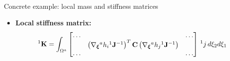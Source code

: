 \documentclass[aspectratio=169]{beamer}
\begin{document}
{\begin{frame}{Concrete example: local mass and stiffness matrices}
\begin{itemize}
    \item \textbf{Local stiffness matrix:}
          $$
            {}^1\mathbf K = \int_{\Omega^a} \begin{bmatrix}
              \dots &                                                                                                                            & \dots \\
                    & \left(\nabla_{\boldsymbol\xi}{}^ah_i {}^1\mathbf J^{-1}\right)^T\mathbf C\left( \nabla_{\boldsymbol\xi}{}^ah_j {}^1\mathbf J^{-1}\right) &       \\
              \dots &                                                                                                                            & \dots \\
            \end{bmatrix} \, {}^1j \, d\xi_2d\xi_1
          $$
  \end{itemize}
\end{frame}

}
\end{document}
